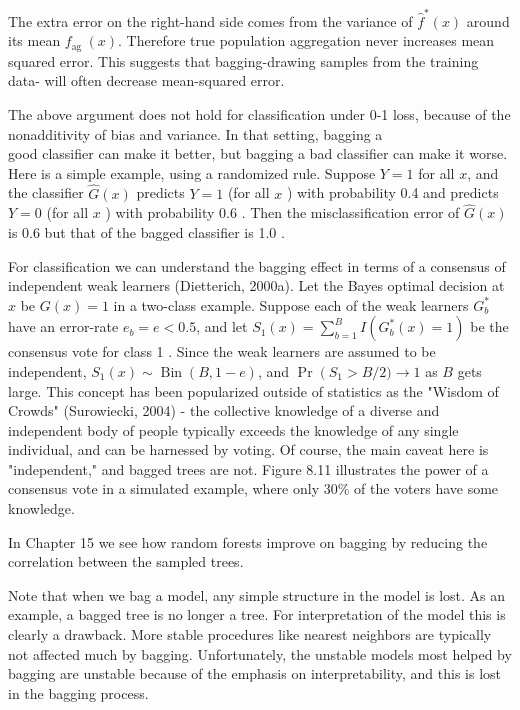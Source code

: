 \documentclass[10pt]{article}
\begin{document}
The extra error on the right-hand side comes from the variance of $\hat{f}^{*}(x)$ around its mean $f_{\text {ag }}(x)$. Therefore true population aggregation never increases mean squared error. This suggests that bagging-drawing samples from the training data- will often decrease mean-squared error.

The above argument does not hold for classification under 0-1 loss, because of the nonadditivity of bias and variance. In that setting, bagging a\\
good classifier can make it better, but bagging a bad classifier can make it worse. Here is a simple example, using a randomized rule. Suppose $Y=1$ for all $x$, and the classifier $\hat{G}(x)$ predicts $Y=1$ (for all $x$ ) with probability 0.4 and predicts $Y=0$ (for all $x$ ) with probability 0.6 . Then the misclassification error of $\hat{G}(x)$ is 0.6 but that of the bagged classifier is 1.0 .

For classification we can understand the bagging effect in terms of a consensus of independent weak learners (Dietterich, 2000a). Let the Bayes optimal decision at $x$ be $G(x)=1$ in a two-class example. Suppose each of the weak learners $G_{b}^{*}$ have an error-rate $e_{b}=e<0.5$, and let $S_{1}(x)= \sum_{b=1}^{B} I\left(G_{b}^{*}(x)=1\right)$ be the consensus vote for class 1 . Since the weak learners are assumed to be independent, $S_{1}(x) \sim \operatorname{Bin}(B, 1-e)$, and $\operatorname{Pr}\left(S_{1}>\right. B / 2) \rightarrow 1$ as $B$ gets large. This concept has been popularized outside of statistics as the "Wisdom of Crowds" (Surowiecki, 2004) - the collective knowledge of a diverse and independent body of people typically exceeds the knowledge of any single individual, and can be harnessed by voting. Of course, the main caveat here is "independent," and bagged trees are not. Figure 8.11 illustrates the power of a consensus vote in a simulated example, where only $30 \%$ of the voters have some knowledge.

In Chapter 15 we see how random forests improve on bagging by reducing the correlation between the sampled trees.

Note that when we bag a model, any simple structure in the model is lost. As an example, a bagged tree is no longer a tree. For interpretation of the model this is clearly a drawback. More stable procedures like nearest neighbors are typically not affected much by bagging. Unfortunately, the unstable models most helped by bagging are unstable because of the emphasis on interpretability, and this is lost in the bagging process.
\end{document}
